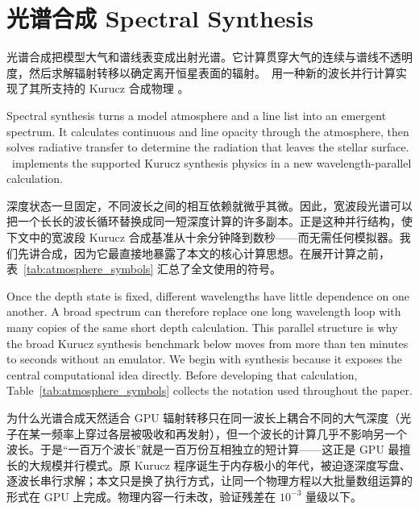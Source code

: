 \section{光谱合成 Spectral Synthesis}\label{sec:synthesis}

光谱合成把模型大气和谱线表变成出射光谱。它计算贯穿大气的连续与谱线不透明度，然后求解辐射转移以确定离开恒星表面的辐射。\paynezero\ 用一种新的波长并行计算实现了其所支持的 Kurucz 合成物理 \citep{Kurucz2005}。

\begin{EN}
Spectral synthesis turns a model atmosphere and a line list into an emergent
spectrum. It calculates continuous and line opacity through the atmosphere,
then solves radiative transfer to determine the radiation that leaves the
stellar surface. \paynezero\ implements the supported
Kurucz synthesis physics \citep{Kurucz2005} in a new
wavelength-parallel calculation.
\end{EN}

深度状态一旦固定，不同波长之间的相互依赖就微乎其微。因此，宽波段光谱可以把一个长长的波长循环替换成同一短深度计算的许多副本。正是这种并行结构，使下文中的宽波段 Kurucz 合成基准从十余分钟降到数秒——而无需任何模拟器。我们先讲合成，因为它最直接地暴露了本文的核心计算思想。在展开计算之前，表~\ref{tab:atmosphere_symbols} 汇总了全文使用的符号。

\begin{EN}
Once the depth state is fixed, different wavelengths have little dependence on
one another. A broad spectrum can therefore replace one long wavelength loop
with many copies of the same short depth calculation. This parallel structure
is why the broad Kurucz synthesis benchmark below moves from more than ten
minutes to seconds without an emulator. We begin with synthesis because it exposes the central
computational idea directly.
Before developing that calculation, Table~\ref{tab:atmosphere_symbols}
collects the notation used throughout the paper.
\end{EN}

\begin{physbox}{为什么光谱合成天然适合 GPU}
辐射转移只在同一波长上耦合不同的大气深度（光子在某一频率上穿过各层被吸收和再发射），但一个波长的计算几乎不影响另一个波长。于是“一百万个波长”就是一百万份互相独立的短计算——这正是 GPU 最擅长的大规模并行模式。原 Kurucz 程序诞生于内存极小的年代，被迫逐深度写盘、逐波长串行求解；本文只是换了执行方式，让同一个物理方程以大批量数组运算的形式在 GPU 上完成。物理内容一行未改，验证残差在 $10^{-3}$ 量级以下。
\end{physbox}

